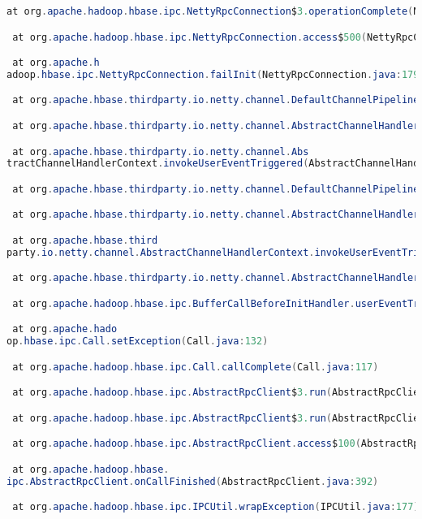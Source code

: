\documentclass{report}%
\begin{document}
\begin{enumerate}
\begin{lstlisting}[language=java]
 at org.apache.hadoop.hbase.ipc.NettyRpcConnection$3.operationComplete(NettyRpcConnection.java:267)

 at org.apache.hadoop.hbase.ipc.NettyRpcConnection.access$500(NettyRpcConnection.java:71)

 at org.apache.h
adoop.hbase.ipc.NettyRpcConnection.failInit(NettyRpcConnection.java:179)

 at org.apache.hbase.thirdparty.io.netty.channel.DefaultChannelPipeline.fireUserEventTriggered(DefaultChannelPipeline.java:924)

 at org.apache.hbase.thirdparty.io.netty.channel.AbstractChannelHandlerContext.invokeUserEventTriggered(AbstractChannelHandlerContext.java:312)

 at org.apache.hbase.thirdparty.io.netty.channel.Abs
tractChannelHandlerContext.invokeUserEventTriggered(AbstractChannelHandlerContext.java:326)

 at org.apache.hbase.thirdparty.io.netty.channel.DefaultChannelPipeline$HeadContext.userEventTriggered(DefaultChannelPipeline.java:1426)

 at org.apache.hbase.thirdparty.io.netty.channel.AbstractChannelHandlerContext.fireUserEventTriggered(AbstractChannelHandlerContext.java:304)

 at org.apache.hbase.third
party.io.netty.channel.AbstractChannelHandlerContext.invokeUserEventTriggered(AbstractChannelHandlerContext.java:312)

 at org.apache.hbase.thirdparty.io.netty.channel.AbstractChannelHandlerContext.invokeUserEventTriggered(AbstractChannelHandlerContext.java:326)

 at org.apache.hadoop.hbase.ipc.BufferCallBeforeInitHandler.userEventTriggered(BufferCallBeforeInitHandler.java:92)

 at org.apache.hado
op.hbase.ipc.Call.setException(Call.java:132)

 at org.apache.hadoop.hbase.ipc.Call.callComplete(Call.java:117)

 at org.apache.hadoop.hbase.ipc.AbstractRpcClient$3.run(AbstractRpcClient.java:419)

 at org.apache.hadoop.hbase.ipc.AbstractRpcClient$3.run(AbstractRpcClient.java:423)

 at org.apache.hadoop.hbase.ipc.AbstractRpcClient.access$100(AbstractRpcClient.java:97)

 at org.apache.hadoop.hbase.
ipc.AbstractRpcClient.onCallFinished(AbstractRpcClient.java:392)

 at org.apache.hadoop.hbase.ipc.IPCUtil.wrapException(IPCUtil.java:177)


\end{lstlisting}
\end{enumerate}
\end{document}
